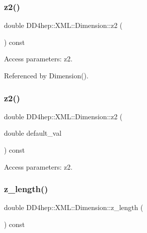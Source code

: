 \subsubsection{\texorpdfstring{z2()}{z2()}\hspace{0.1cm}{\footnotesize\ttfamily [1/2]}}
{\footnotesize\ttfamily double D\+D4hep\+::\+X\+M\+L\+::\+Dimension\+::z2 (\begin{DoxyParamCaption}{ }\end{DoxyParamCaption}) const}



Access parameters\+: z2. 



Referenced by Dimension().

\hypertarget{struct_d_d4hep_1_1_x_m_l_1_1_dimension_acc56534800575f9b095c98a32a1e8b0c}{}\label{struct_d_d4hep_1_1_x_m_l_1_1_dimension_acc56534800575f9b095c98a32a1e8b0c} 
\subsubsection{\texorpdfstring{z2()}{z2()}\hspace{0.1cm}{\footnotesize\ttfamily [2/2]}}
{\footnotesize\ttfamily double D\+D4hep\+::\+X\+M\+L\+::\+Dimension\+::z2 (\begin{DoxyParamCaption}\item[{double}]{default\+\_\+val }\end{DoxyParamCaption}) const}



Access parameters\+: z2. 

\hypertarget{struct_d_d4hep_1_1_x_m_l_1_1_dimension_a2f1a16817409d14fc203ad003933d805}{}\label{struct_d_d4hep_1_1_x_m_l_1_1_dimension_a2f1a16817409d14fc203ad003933d805} 
\subsubsection{\texorpdfstring{z\+\_\+length()}{z\_length()}}
{\footnotesize\ttfamily double D\+D4hep\+::\+X\+M\+L\+::\+Dimension\+::z\+\_\+length (\begin{DoxyParamCaption}{ }\end{DoxyParamCaption}) const}



